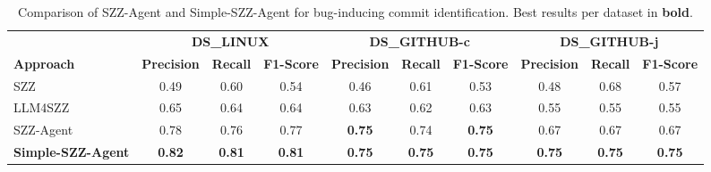 \begin{table}[t]
\centering
\caption{Comparison of SZZ-Agent and Simple-SZZ-Agent for bug-inducing commit identification. Best results per dataset in \textbf{bold}.}
\label{tab:agent_comparison}
\begin{tabular}{lccccccccc}
\toprule
 & \multicolumn{3}{c}{\textbf{DS\_LINUX}} & \multicolumn{3}{c}{\textbf{DS\_GITHUB-c}} & \multicolumn{3}{c}{\textbf{DS\_GITHUB-j}} \\
\cmidrule(lr){2-4} \cmidrule(lr){5-7} \cmidrule(lr){8-10}
\textbf{Approach} & \textbf{Precision} & \textbf{Recall} & \textbf{F1-Score} & \textbf{Precision} & \textbf{Recall} & \textbf{F1-Score} & \textbf{Precision} & \textbf{Recall} & \textbf{F1-Score} \\
\midrule
SZZ & 0.49 & 0.60 & 0.54 & 0.46 & 0.61 & 0.53 & 0.48 & 0.68 & 0.57 \\
LLM4SZZ & 0.65 & 0.64 & 0.64 & 0.63 & 0.62 & 0.63 & 0.55 & 0.55 & 0.55 \\
SZZ-Agent & 0.78 & 0.76 & 0.77 & \textbf{0.75} & 0.74 & \textbf{0.75} & 0.67 & 0.67 & 0.67 \\
\midrule
\rowcolor{gray!20} \textbf{Simple-SZZ-Agent} & \textbf{0.82} & \textbf{0.81} & \textbf{0.81} & \textbf{0.75} & \textbf{0.75} & \textbf{0.75} & \textbf{0.75} & \textbf{0.75} & \textbf{0.75} \\
\bottomrule
\end{tabular}
\end{table}

